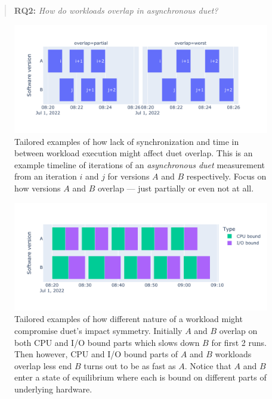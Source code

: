 \begin{quote}
	\textbf{RQ2:} \emph{How do workloads overlap in asynchronous duet?}
\end{quote}

\begin{figure}
	\centering
	\includegraphics[width=.9\linewidth]{./figures/overlap_timeline.pdf}
	\caption{
		Tailored examples of how lack of synchronization and time in between workload execution might affect duet overlap.
		This is an example timeline of iterations of an \emph{asynchronous duet} measurement from an iteration $i$ and $j$ for versions $A$ and $B$ respectively.
		Focus on how versions $A$ and $B$ overlap --- just partially or even not at all.
	}
	\label{fig:overlap_timeline}
\end{figure}

\begin{figure}
	\centering
	\includegraphics[width=.9\linewidth]{./figures/overlap_interference.pdf}
	\caption{
		Tailored examples of how different nature of a workload might compromise duet's impact symmetry.
		Initially $A$ and $B$ overlap on both CPU and I/O bound parts which slows down $B$ for first 2 runs.
		Then however, CPU and I/O bound parts of $A$ and $B$ workloads overlap less end $B$ turns out to be as fast as $A$.
		Notice that $A$ and $B$ enter a state of equilibrium where each is bound on different parts of underlying hardware.
	}
	\label{fig:overlap_interference}
\end{figure}

